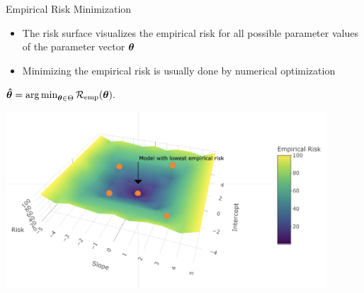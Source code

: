 \documentclass[11pt,compress,t,notes=noshow, xcolor=table]{beamer}
\begin{document}
\begin{vbframe}{Empirical Risk Minimization}

\begin{itemize}
\item \small The risk surface visualizes the empirical risk for all possible parameter values of the parameter vector $\bm{\theta}$
\item \small Minimizing the empirical risk is usually done by numerical optimization
\end{itemize}

\begin{center}
$
\bm{\hat\theta} = \operatorname{arg\,min}_{\bm{\theta} \in \Theta} \mathcal{R}_{\text{emp}}(\bm{\theta}).
$
\end{center}


\begin{center}
 \includegraphics[width = 0.9\textwidth]{slides/ml-basics/figure_man/nutshell-ml-basics-risk-surface.png}
\end{center}





\end{vbframe}
\end{document}
